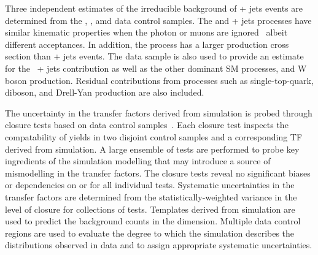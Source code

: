 Three independent estimates of the irreducible background of \znunu +
jets events are determined from the \gj, \mmj, amd \mj data control
samples.  The \gj and \zmumu + jets processes have similar kinematic
properties when the photon or muons are ignored~\cite{Bern:2011pa}
albeit different acceptances. In addition, the \gj process has a
larger production cross section than \znunu + jets events. The \mj
data sample is also used to provide an estimate for the \znunu\ + jets
contribution as well as the other dominant SM processes, \ttbar and W
boson production. Residual contributions from processes such as
single-top-quark, diboson, and Drell-Yan production are also included.

The uncertainty in the transfer factors derived from simulation is
probed through closure tests based on data control
samples~\cite{RA1Paper2012}. Each closure test inspects the
compatability of yields in two disjoint control samples and a
corresponding TF derived from simulation. A large ensemble of tests
are performed to probe key ingredients of the simulation modelling
that may introduce a source of mismodelling in the transfer
factors. The closure tests reveal no significant biases or
dependencies on \njet or \scalht for all individual tests. Systematic
uncertainties in the transfer factors are determined from the
statistically-weighted variance in the level of closure for
collections of tests. Templates derived from simulation are used to
predict the background counts in the \mht dimension. Multiple data
control regions are used to evaluate the degree to which the
simulation describes the \mht distributions observed in data and to
assign appropriate systematic uncertainties.

